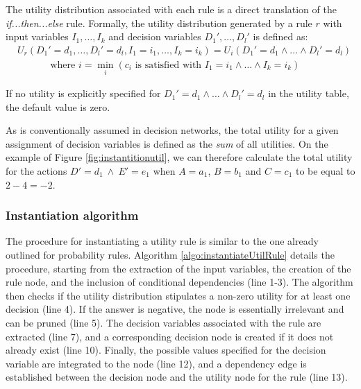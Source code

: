 The utility distribution associated with each rule is a direct translation of the  \textit{if...then...else} rule.  Formally, the utility distribution generated by a rule $r$ with input variables $I_1, \dots, I_k$ and decision variables $D_1', \dots, D_l'$ is defined as:
\begin{align}
& U_r(D_1'\!=\!d_1, \dots, D_l'\!=\!d_l, I_1\!=\!i_1, \dots, I_k\!=\!i_k) = U_i(D_1'\!=\!d_1 \land \dots \land D_l'\!=\!d_l) \label{eq:utildistrib}\\
&  \; \; \; \; \; \; \; \;  \; \; \; \text{ where } i = \min_i (c_i \text{ is satisfied with } I_1\!=\!i_1 \land \dots \land I_k\!=\!i_k) \nonumber
\end{align}

If no utility is explicitly specified for $D_1'\!=\!d_1 \land \dots \land D_l'\!=\!d_l$ in the utility table, the default value is zero. 

As is conventionally assumed in decision networks, the total utility for a given assignment of decision variables is defined as the \textit{sum} of all utilities.  On the example of Figure \ref{fig:instantitionutil}, we can therefore calculate the total utility for the actions $D'\!=\!d_1 \ \land \ E'\!=\!e_1$ when $A\!=\!a_1$, $B\!=\!b_1$ and $C\!=\!c_1$ to be equal to $2 - 4 = -2$. 


\subsubsection*{Instantiation algorithm} 

The procedure for instantiating a utility rule is similar to the one already outlined for probability rules. Algorithm \ref{algo:instantiateUtilRule} details the procedure, starting from the extraction of the input variables, the creation of the rule node, and the inclusion of conditional dependencies (line 1-3). The algorithm then checks if the utility distribution stipulates a non-zero utility for at least one decision (line 4).  If the answer is negative, the node is essentially irrelevant and can be pruned (line 5).  The decision variables associated with the rule are extracted (line 7), and a corresponding decision node is created if it does not already exist (line 10). Finally, the possible values specified for the decision variable are integrated to the node (line 12), and a dependency edge is established between the decision node and the utility node for the rule (line 13). 

